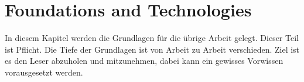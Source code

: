 

\chapter{Foundations and Technologies }
\label{chap:basics}

In diesem Kapitel werden die Grundlagen für die übrige Arbeit gelegt.
Dieser Teil ist Pflicht.
Die Tiefe der Grundlagen ist von Arbeit zu Arbeit verschieden.
Ziel ist es den Leser abzuholen und mitzunehmen, dabei kann ein gewisses Vorwissen vorausgesetzt werden.
